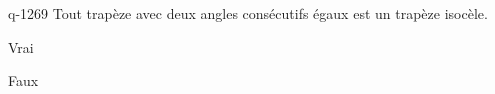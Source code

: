 \begin{truefalse}{q-1269}
Tout trapèze avec deux angles consécutifs égaux est un trapèze isocèle.
\item Vrai
\item* Faux
\end{truefalse}

